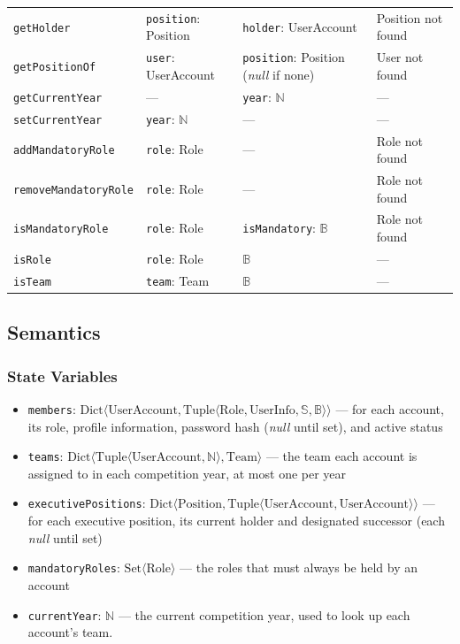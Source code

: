 \documentclass[12pt, titlepage]{article}
\begin{document}
\begin{tabularx}{\textwidth}{p{4.1cm} p{4.2cm} p{2.5cm} X}
\texttt{getHolder} & \texttt{position}: Position & \texttt{holder}: UserAccount & Position not found \\
\texttt{getPositionOf} & \texttt{user}: UserAccount & \texttt{position}: Position (\textit{null} if none) & User not found \\
\texttt{getCurrentYear} & --- & \texttt{year}: $\mathbb{N}$ & --- \\
\texttt{setCurrentYear} & \texttt{year}: $\mathbb{N}$ & --- & --- \\
\texttt{addMandatoryRole} & \texttt{role}: Role & --- & Role not found \\
\texttt{removeMandatoryRole} & \texttt{role}: Role & --- & Role not found \\
\texttt{isMandatoryRole} & \texttt{role}: Role & \texttt{isMandatory}: $\mathbb{B}$ & Role not found \\
\texttt{isRole} & \texttt{role}: Role & $\mathbb{B}$ & --- \\
\texttt{isTeam} & \texttt{team}: Team & $\mathbb{B}$ & --- \\
\bottomrule
\end{tabularx}

\subsection{Semantics}

\subsubsection{State Variables}
\begin{itemize}
  \item \texttt{members}: $\text{Dict}\langle \text{UserAccount}, \text{Tuple}\langle \text{Role}, \text{UserInfo}, \mathbb{S}, \mathbb{B} \rangle \rangle$ --- for each account, its role, profile information, password hash (\textit{null} until set), and active status
  \item \texttt{teams}: $\text{Dict}\langle \text{Tuple}\langle \text{UserAccount}, \mathbb{N} \rangle, \text{Team} \rangle$ --- the team each account is assigned to in each competition year, at most one per year
  \item \texttt{executivePositions}: $\text{Dict}\langle \text{Position}, \text{Tuple}\langle \text{UserAccount}, \text{UserAccount} \rangle \rangle$ --- for each executive position, its current holder and designated successor (each \textit{null} until set)
  \item \texttt{mandatoryRoles}: $\text{Set}\langle \text{Role} \rangle$ --- the roles that must always be held by an account
  \item \texttt{currentYear}: $\mathbb{N}$ --- the current competition year, used to look up each account's team. %
\end{itemize}
\end{document}
